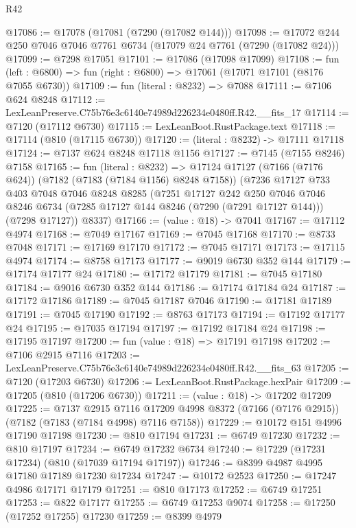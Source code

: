 \begin{lexlean}{R42}
\begin{coremodule}
{@17086 := @17078 (@17081 (@7290 (@17082 @144)))
@17098 := @17072 @244 @250 @7046 @7046 @7761 @6734 (@17079 @24 @7761 (@7290 (@17082 @24)))
@17099 := @7298 @17051
@17101 := @17086 (@17098 @17099)
@17108 := fun (left : @6800) => fun (right : @6800) => @17061 (@17071 @17101 (@8176 @7055 @6730))
@17109 := fun (literal : @8232) => @7088
@17111 := @7106 @624 @8248
@17112 := LexLeanPreserve.C75b76e3c6140e74989d226234e0480ff.R42.__fits_17
@17114 := @7120 (@17112 @6730)
@17115 := LexLeanBoot.RustPackage.text
@17118 := @17114 (@810 (@17115 @6730))
@17120 := (literal : @8232) -> @17111 @17118
@17124 := @7137 @624 @8248 @17118 @1156
@17127 := @7145 (@7155 @8246) @7158
@17165 := fun (literal : @8232) =>
  @17124
    @17127
    (@7166 (@7176 @624))
    (@7182 (@7183 (@7184 @1156) @8248 @7158))
    (@7236
      @17127
      @733
      @403
      @7048
      @7046
      @8248
      @8285
      (@7251
        @17127
        @242
        @250
        @7046
        @7046
        @8246
        @6734
        (@7285 @17127 @144 @8246 (@7290 (@7291 @17127 @144)))
        (@7298 @17127))
      @8337)
@17166 := (value : @18) -> @7041
@17167 := @17112 @4974
@17168 := @7049 @17167
@17169 := @7045 @17168
@17170 := @8733 @7048
@17171 := @17169 @17170
@17172 := @7045 @17171
@17173 := @17115 @4974
@17174 := @8758 @17173
@17177 := @9019 @6730 @352 @144
@17179 := @17174 @17177 @24
@17180 := @17172 @17179
@17181 := @7045 @17180
@17184 := @9016 @6730 @352 @144
@17186 := @17174 @17184 @24
@17187 := @17172 @17186
@17189 := @7045 @17187 @7046
@17190 := @17181 @17189
@17191 := @7045 @17190
@17192 := @8763 @17173
@17194 := @17192 @17177 @24
@17195 := @17035 @17194
@17197 := @17192 @17184 @24
@17198 := @17195 @17197
@17200 := fun (value : @18) => @17191 @17198
@17202 := @7106 @2915 @7116
@17203 := LexLeanPreserve.C75b76e3c6140e74989d226234e0480ff.R42.__fits_63
@17205 := @7120 (@17203 @6730)
@17206 := LexLeanBoot.RustPackage.hexPair
@17209 := @17205 (@810 (@17206 @6730))
@17211 := (value : @18) -> @17202 @17209
@17225 := @7137
    @2915
    @7116
    @17209
    @4998
    @8372
    (@7166 (@7176 @2915))
    (@7182 (@7183 (@7184 @4998) @7116 @7158))
@17229 := @10172 @151 @4996 @17190 @17198
@17230 := @810 @17194
@17231 := @6749 @17230
@17232 := @810 @17197
@17234 := @6749 @17232 @6734
@17240 := @17229 (@17231 @17234) (@810 (@17039 @17194 @17197))
@17246 := @8399 @4987 @4995 @17180 @17189 @17230 @17234
@17247 := @10172 @2523
@17250 := @17247 @4986 @17171 @17179
@17251 := @810 @17173
@17252 := @6749 @17251
@17253 := @822 @17177
@17255 := @6749 @17253 @9074
@17258 := @17250 (@17252 @17255) @17230
@17259 := @8399 @4979
}
\end{coremodule}
\end{lexlean}
